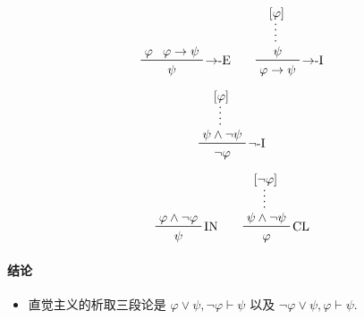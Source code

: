 \documentclass[a4paper]{article}
\begin{document}
    \hrulefill

\[
    \prftree[r]{$\to$-E}
        {\varphi}
        {\varphi \to \psi}
        {\psi}
    \qquad
    \prftree[r]{$\to$-I}
        {\prfsummary{\prfboundedassumption{\varphi}}{\psi}}
        {\varphi \to \psi}
    \]

    \hrulefill

\[
    \prftree[r]{$\lnot$-I}
        {\prfsummary{\prfboundedassumption{\varphi}}{\psi \land \lnot \psi}}
        {\lnot \varphi}
    \]

    \hrulefill

\[
    \prftree[r]{IN}
        {\varphi \land\lnot\varphi}
        {\psi}
    \qquad
    \prftree[r]{CL}
        {\prfsummary{\prfboundedassumption{\lnot\varphi}}{\psi \land \lnot \psi}}
        {\varphi}
    \]

\paragraph{结论}
\begin{itemize}
    \item 直觉主义的析取三段论是 $\varphi \lor \psi, \lnot\varphi\vdash \psi$ 以及
        $\lnot\varphi \lor \psi, \varphi \vdash \psi$.
\end{itemize}
\end{document}
